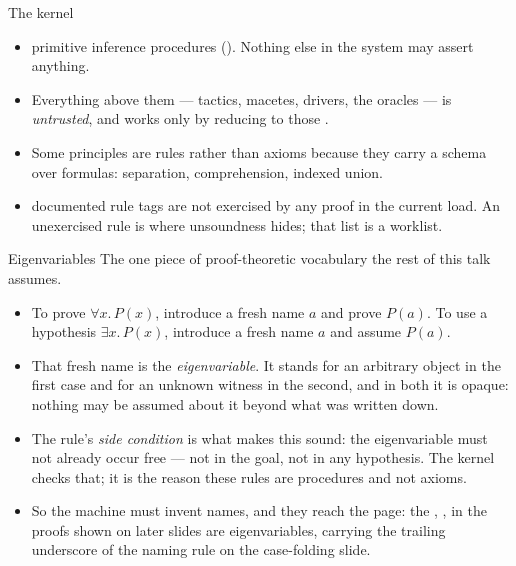 \documentclass[11pt,aspectratio=169]{beamer}
\begin{document}
\begin{frame}{The kernel}
  \begin{itemize}
    \item \Nkernel{} primitive inference procedures
          (). Nothing else in the system may
          assert anything.
    \item Everything above them --- tactics, macetes, drivers, the oracles ---
          is \emph{untrusted}, and works only by reducing to those \Nkernel.
    \item Some principles are rules rather than axioms because they carry a
          schema over formulas: separation, comprehension, indexed union.
    \item \Nunexer{} documented rule tags are not exercised by any proof in the
          current load. An unexercised rule is where unsoundness hides; that
          list is a worklist.
  \end{itemize}
\end{frame}

\begin{frame}{Eigenvariables}
  The one piece of proof-theoretic vocabulary the rest of this talk assumes.
  \begin{itemize}
    \item To prove $\forall x.\, P(x)$, introduce a fresh name $a$ and prove
          $P(a)$. To use a hypothesis $\exists x.\, P(x)$, introduce a fresh
          name $a$ and assume $P(a)$.
    \item That fresh name is the \emph{eigenvariable}. It stands for an
          arbitrary object in the first case and for an unknown witness in the
          second, and in both it is opaque: nothing may be assumed about it
          beyond what was written down.
    \item The rule's \emph{side condition} is what makes this sound: the
          eigenvariable must not already occur free --- not in the goal, not in
          any hypothesis. The kernel checks that; it is the reason these rules
          are procedures and not axioms.
    \item So the machine must invent names, and they reach the page: the
          , ,  in the proofs shown on later
          slides are eigenvariables, carrying the trailing underscore of the
          naming rule on the case-folding slide.
  \end{itemize}
\end{frame}
\end{document}
